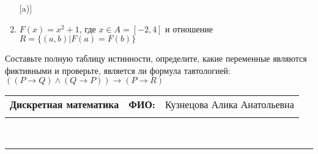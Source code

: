 \documentclass[10pt]{exam}
\newcommand{\class}{Дискретная математика}
\newcommand{\examdate}{}
\begin{document}
\begin{questions}
\begin{enumerate} [a)]
\item $F(x)=x^{2}+1$, где $x \in A = [-2, 4]$ и отношение $R = \{(a,b)|F(a) = F(b)\}$
\end{enumerate}\question Составьте полную таблицу истинности, определите, какие переменные являются фиктивными и проверьте, является ли формула тавтологией:
$(( P \rightarrow Q) \land (Q \rightarrow P)) \rightarrow (P \rightarrow R)$

\end{questions}
\newpage
\begin{flushright}
\begin{tabular}{p{2.8in} r l}
\textbf{\class} & \textbf{ФИО:} &Кузнецова Алика Анатольевна
\\

\textbf{\examdate} &&\\
\end{tabular}\\
\end{flushright}
\rule[1ex]{\textwidth}{.1pt}
\end{document}

